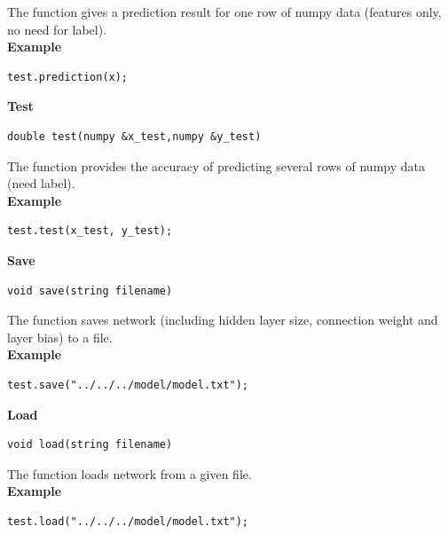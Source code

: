 \documentclass[a4paper]{article}
\begin{document}
The function gives a prediction result for one row of numpy data (features only, no need for label).\\
\textbf{Example}
\begin{lstlisting}[language={[ANSI]C++},keywordstyle=\color{blue!70},commentstyle=\color{red!50!green!50!blue!50},frame=shadowbox, rulesepcolor=\color{red!20!green!20!blue!20}]
test.prediction(x);
\end{lstlisting}
\textbf{\Large Test}
\begin{lstlisting}[language={[ANSI]C++},keywordstyle=\color{blue!70},commentstyle=\color{red!50!green!50!blue!50},frame=shadowbox, rulesepcolor=\color{red!20!green!20!blue!20}]
double test(numpy &x_test,numpy &y_test)
\end{lstlisting}

The function provides the accuracy of predicting several rows of numpy data (need label).\\
\textbf{Example}
\begin{lstlisting}[language={[ANSI]C++},keywordstyle=\color{blue!70},commentstyle=\color{red!50!green!50!blue!50},frame=shadowbox, rulesepcolor=\color{red!20!green!20!blue!20}]
test.test(x_test, y_test);
\end{lstlisting}
\textbf{\Large Save}
\begin{lstlisting}[language={[ANSI]C++},keywordstyle=\color{blue!70},commentstyle=\color{red!50!green!50!blue!50},frame=shadowbox, rulesepcolor=\color{red!20!green!20!blue!20}]
void save(string filename)
\end{lstlisting}

The function saves network (including hidden layer size, connection weight and layer bias) to a file.\\
\textbf{Example}
\begin{lstlisting}[language={[ANSI]C++},keywordstyle=\color{blue!70},commentstyle=\color{red!50!green!50!blue!50},frame=shadowbox, rulesepcolor=\color{red!20!green!20!blue!20}]
test.save("../../../model/model.txt");
\end{lstlisting}
\textbf{\Large Load}
\begin{lstlisting}[language={[ANSI]C++},keywordstyle=\color{blue!70},commentstyle=\color{red!50!green!50!blue!50},frame=shadowbox, rulesepcolor=\color{red!20!green!20!blue!20}]
void load(string filename)
\end{lstlisting}

The function loads network from a given file.\\
\textbf{Example}
\begin{lstlisting}[language={[ANSI]C++},keywordstyle=\color{blue!70},commentstyle=\color{red!50!green!50!blue!50},frame=shadowbox, rulesepcolor=\color{red!20!green!20!blue!20}]
test.load("../../../model/model.txt");
\end{lstlisting}
\end{document}
